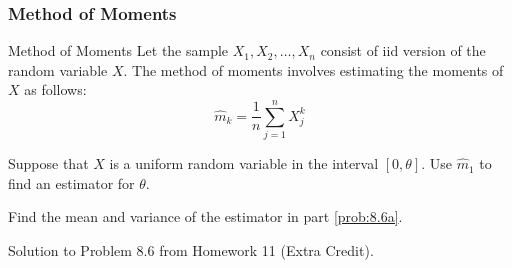 \subsubsection{Method of Moments}\label{subsubsec:Method of Moments}
\begin{example}{Method of Moments}
  Let the sample $X_{1}, X_{2}, \ldots, X_{n}$ consist of iid version of the random variable $X$. The method of moments involves estimating the moments of $X$ as follows:
  \begin{equation*}
    \hat{m}_{k} = \frac{1}{n} \sum\limits_{j=1}^{n} X_{j}^{k}
  \end{equation*}
  \begin{boldalphlist}
  \item Suppose that $X$ is a uniform random variable in the interval $\left[ 0, \theta \right]$. Use $\hat{m}_{1}$ to find an estimator for $\theta$.\label{prob:8.6a}
  \item Find the mean and variance of the estimator in part \ref{prob:8.6a}.
  \end{boldalphlist}

  \tcblower

  Solution to Problem 8.6 from Homework 11 (Extra Credit).
\end{example}

